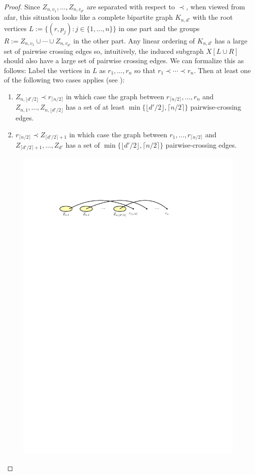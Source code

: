 \documentclass[kpfonts]{patmorin}
\begin{document}
\begin{proof}
    Since $Z_{n,v_1},\ldots,Z_{n,v_{d'}}$ are separated with respect to $\prec$, when viewed from afar, this situation looks like a complete bipartite graph $K_{n,d'}$ with the root vertices $L:=\{(r,p_j):j\in\{1,\ldots,n\}\}$ in one part and the groups $R:=Z_{n,v_1}\cup\cdots\cup Z_{n,v_{d'}}$ in the other part.  Any linear ordering of $K_{n,d'}$ has a large set of pairwise crossing edges so, intuitively, the induced subgraph $X[L\cup R]$ should also have a large set of pairwise crossing edges. We can formalize this as follows: Label the vertices in $L$ as $r_1,\ldots,r_n$ so that $r_1\prec \cdots\prec r_{n}$.  Then at least one of the following two cases applies (see ):
    \begin{enumerate}
        \item $Z_{n,\lfloor d'/2\rfloor}\prec r_{\lceil n/2\rceil}$ in which case the graph between $r_{\lceil n/2\rceil},\ldots,r_{n}$ and $Z_{n,1},\ldots,Z_{n,\lfloor d'/2\rfloor}$ has a set of at least $\min\{\lfloor d'/2\rfloor,\lceil n/2\rceil\}$ pairwise-crossing edges.
        \item $r_{\lceil n/2\rceil}\prec Z_{\lceil d'/2\rceil+1}$ in which case the graph between $r_1,\ldots,r_{\lceil n/2\rceil}$ and $Z_{\lceil d'/2\rceil+1},\ldots,Z_{d'}$ has a set of $\min\{\lfloor d'/2\rfloor,\lceil n/2\rceil\}$ pairwise-crossing edges.
    \end{enumerate}
	\begin{figure}[!h]
		\centering
			\includegraphics{figs/median-1} \\[2em]

\end{figure}
\end{proof}
\end{document}

